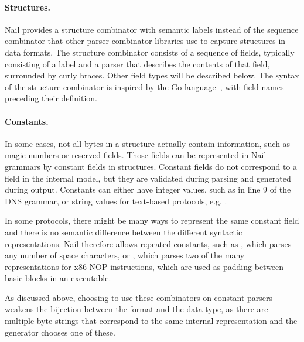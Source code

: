 \paragraph{Structures.}

Nail provides a structure combinator with semantic labels instead of the sequence combinator that
other parser combinator libraries use to capture structures in data formats. 
The structure combinator consists of a sequence of fields, typically consisting of a label and a
parser that describes the contents of that field, surrounded by curly braces. Other field types will be described below.
 The syntax of the structure combinator is inspired by the Go language~\cite{golang}, with field
 names preceding their definition.



\paragraph{Constants.}
In some cases, not all bytes in a structure actually contain information, such as magic numbers or
reserved fields. Those fields can be represented in Nail grammars by constant fields in structures.
Constant fields do not correspond to a field in the internal model, but they are validated during
parsing and generated during output.  Constants can either have integer values, such as
in line 9 of the DNS grammar, or string values for text-based protocols, e.g. .


In some protocols, there might be many ways to represent the same constant field
and there is no semantic difference between the different syntactic representations.
Nail therefore allows repeated constants, such as , which parses any number of space characters, or
, which parses two of the many representations for x86
NOP instructions, which are used as padding between basic blocks in an executable. 

As discussed above, choosing to use these combinators on constant parsers
weakens the bijection between the format and the data type, as there are
multiple byte-strings that correspond to the same internal representation and
the generator chooses one of these.

